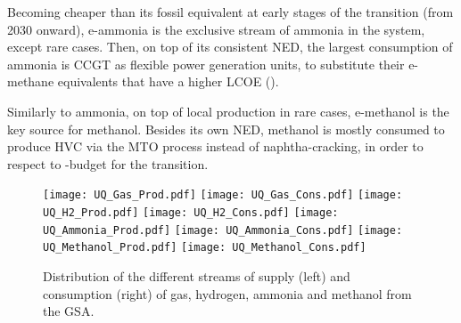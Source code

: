 Becoming cheaper than its fossil equivalent at early stages of the transition (\ie from 2030 onward), e-ammonia is the exclusive stream of ammonia in the system, except rare cases. Then, on top of its consistent \gls{NED}, the largest consumption of ammonia is \gls{CCGT} as flexible power generation units, to substitute their e-methane equivalents that have a higher \gls{LCOE} ().

Similarly to ammonia, on top of local production in rare cases, e-methanol is the key source for methanol. Besides its own \gls{NED}, methanol is mostly consumed to produce \gls{HVC} via the \gls{MTO} process instead of naphtha-cracking, in order to respect to -budget for the transition.

\begin{figure}[htbp!]
\centering
\texttt{[image: UQ\_Gas\_Prod.pdf]}
\texttt{[image: UQ\_Gas\_Cons.pdf]}
\texttt{[image: UQ\_H2\_Prod.pdf]}
\texttt{[image: UQ\_H2\_Cons.pdf]}
\texttt{[image: UQ\_Ammonia\_Prod.pdf]}
\texttt{[image: UQ\_Ammonia\_Cons.pdf]}
\texttt{[image: UQ\_Methanol\_Prod.pdf]}
\texttt{[image: UQ\_Methanol\_Cons.pdf]}
\caption{Distribution of the different streams of supply (left) and consumption (right) of gas, hydrogen, ammonia and methanol from the \acrfull{GSA}.}
\label{fig:results_uq_prod_cons}
\end{figure}
